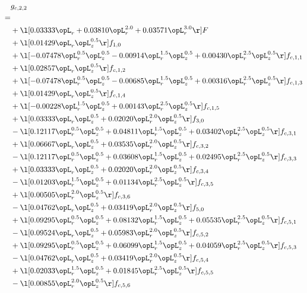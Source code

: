 \begin{alignat}{2} 
\label{eq:g_22_0} 
& g_{c,2,2} \nonumber \\ 
 = \\ 
& + \l[  0.03333 \opL_r +  0.03810 \opL_r^{2.0} +  0.03571 \opL_r^{3.0}  \r] F \nonumber \\ 
& + \l[  0.01429 \opL_r \opL_z^{0.5}  \r] f_{1,0} \nonumber \\ 
& + \l[  -0.07478 \opL_r^{0.5} \opL_z^{0.5}   -0.00914 \opL_r^{1.5} \opL_z^{0.5} +  0.00430 \opL_r^{2.5} \opL_z^{0.5}  \r] f_{c,1,1} \nonumber \\ 
& + \l[  0.02857 \opL_r \opL_z^{0.5}  \r] f_{c,1,2} \nonumber \\ 
& + \l[  -0.07478 \opL_r^{0.5} \opL_z^{0.5}   -0.00685 \opL_r^{1.5} \opL_z^{0.5} +  0.00316 \opL_r^{2.5} \opL_z^{0.5}  \r] f_{c,1,3} \nonumber \\ 
& + \l[  0.01429 \opL_r \opL_z^{0.5}  \r] f_{c,1,4} \nonumber \\ 
& + \l[  -0.00228 \opL_r^{1.5} \opL_z^{0.5} +  0.00143 \opL_r^{2.5} \opL_z^{0.5}  \r] f_{c,1,5} \nonumber \\ 
& + \l[  0.03333 \opL_r \opL_z^{0.5} +  0.02020 \opL_r^{2.0} \opL_z^{0.5}  \r] f_{3,0} \nonumber \\ 
& - \l[  0.12117 \opL_r^{0.5} \opL_z^{0.5} +  0.04811 \opL_r^{1.5} \opL_z^{0.5} +  0.03402 \opL_r^{2.5} \opL_z^{0.5}  \r] f_{c,3,1} \nonumber \\ 
& + \l[  0.06667 \opL_r \opL_z^{0.5} +  0.03535 \opL_r^{2.0} \opL_z^{0.5}  \r] f_{c,3,2} \nonumber \\ 
& - \l[  0.12117 \opL_r^{0.5} \opL_z^{0.5} +  0.03608 \opL_r^{1.5} \opL_z^{0.5} +  0.02495 \opL_r^{2.5} \opL_z^{0.5}  \r] f_{c,3,3} \nonumber \\ 
& + \l[  0.03333 \opL_r \opL_z^{0.5} +  0.02020 \opL_r^{2.0} \opL_z^{0.5}  \r] f_{c,3,4} \nonumber \\ 
& - \l[  0.01203 \opL_r^{1.5} \opL_z^{0.5} +  0.01134 \opL_r^{2.5} \opL_z^{0.5}  \r] f_{c,3,5} \nonumber \\ 
& + \l[  0.00505 \opL_r^{2.0} \opL_z^{0.5}  \r] f_{c,3,6} \nonumber \\ 
& - \l[  0.04762 \opL_r \opL_z^{0.5} +  0.03419 \opL_r^{2.0} \opL_z^{0.5}  \r] f_{5,0} \nonumber \\ 
& + \l[  0.09295 \opL_r^{0.5} \opL_z^{0.5} +  0.08132 \opL_r^{1.5} \opL_z^{0.5} +  0.05535 \opL_r^{2.5} \opL_z^{0.5}  \r] f_{c,5,1} \nonumber \\ 
& - \l[  0.09524 \opL_r \opL_z^{0.5} +  0.05983 \opL_r^{2.0} \opL_z^{0.5}  \r] f_{c,5,2} \nonumber \\ 
& + \l[  0.09295 \opL_r^{0.5} \opL_z^{0.5} +  0.06099 \opL_r^{1.5} \opL_z^{0.5} +  0.04059 \opL_r^{2.5} \opL_z^{0.5}  \r] f_{c,5,3} \nonumber \\ 
& - \l[  0.04762 \opL_r \opL_z^{0.5} +  0.03419 \opL_r^{2.0} \opL_z^{0.5}  \r] f_{c,5,4} \nonumber \\ 
& + \l[  0.02033 \opL_r^{1.5} \opL_z^{0.5} +  0.01845 \opL_r^{2.5} \opL_z^{0.5}  \r] f_{c,5,5} \nonumber \\ 
& - \l[  0.00855 \opL_r^{2.0} \opL_z^{0.5}  \r] f_{c,5,6} \nonumber \\ 
\end{alignat} 


